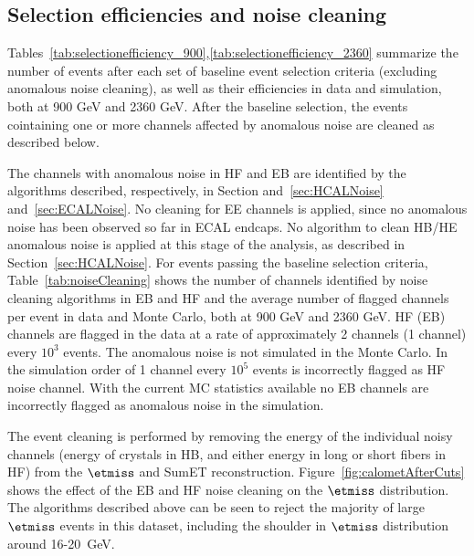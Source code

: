 
\subsection{Selection efficiencies and noise cleaning}

Tables~\ref{tab:selectionefficiency_900},\ref{tab:selectionefficiency_2360}
summarize the number of events after each set of baseline event selection
criteria (excluding anomalous noise cleaning), 
as well as their efficiencies in data and simulation, both at 900 GeV and 2360 GeV. 
After the baseline selection, the events cointaining one or more channels 
affected by anomalous noise are cleaned as described below.
 
The channels with anomalous noise in HF and EB are identified by the algorithms 
described, respectively, in Section and~\ref{sec:HCALNoise} and~\ref{sec:ECALNoise}.
No cleaning for EE channels is applied, since no anomalous noise has been observed 
so far in ECAL endcaps. No algorithm to clean HB/HE anomalous noise is applied 
at this stage of the analysis, as described in Section~\ref{sec:HCALNoise}.
For events passing the baseline selection criteria, Table~\ref{tab:noiseCleaning} shows the number of
channels identified by noise cleaning algorithms in EB and HF and the average number of flagged channels 
per event in data and Monte Carlo, both at 900 GeV and 2360 GeV.
HF (EB) channels are flagged in the data at a rate of approximately 2 channels (1 channel) 
every $10^3$ events. The anomalous noise is not simulated in the Monte Carlo. In the simulation 
order of 1 channel every $10^5$ events is incorrectly flagged as HF noise channel.
With the current MC statistics available no EB channels are incorrectly flagged 
as anomalous noise in the simulation.

The event cleaning is performed by removing the energy of the 
individual noisy channels (energy of crystals in HB, and either energy in 
long or short fibers in HF) from the $\etmiss$ and SumET reconstruction.
Figure~\ref{fig:calometAfterCuts} shows the effect of the EB and HF 
noise cleaning on the $\etmiss$ distribution.
The algorithms described above can be seen to reject the majority of
large $\etmiss$ events in this dataset, 
including the shoulder in $\etmiss$ distribution around 16-20~GeV.

